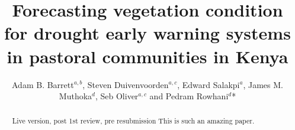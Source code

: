 \documentclass[review]{elsarticle}
\begin{document}
\newcommand{\edit}[1]{\textcolor{blue}{#1}}

\begin{frontmatter}

\title{Forecasting vegetation condition for drought early warning systems in pastoral communities in Kenya}


\author{Adam B. Barrett$^{a,b}$, Steven Duivenvoorden$^{a,c}$, Edward Salakpi$^a$, James M. Muthoka$^{d}$, Seb Oliver$^{a,c}$ and Pedram Rowhani$^{d}$*}
\address{
	$^{a}$ \quad The Data Intensive Science Centre, Department of Physics and Astronomy, University of Sussex, Brighton BN1 9QH, UK\\
	$^{b}$ \quad Sackler Centre for Consciousness Science, Department of Informatics, University of Sussex, Brighton BN1 9QJ, UK \\
	$^{c}$ \quad Astronomy Centre, Department of Physics and Astronomy, University of Sussex, Brighton BN1 9QH, UK\\
	$^{d}$ \quad School of Global Studies, Department of Geography, University of Sussex, Brighton, BN1 9QJ, UK \\
	*Corresponding author: P.Rowhani@sussex.ac.uk
	}








\begin{abstract}
{\color{red} Live version, post 1st review, pre resubmission}
This is such an amazing paper.


\end{abstract}
\end{frontmatter}
\end{document}
